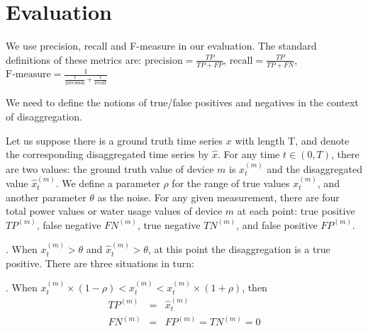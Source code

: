 \section{Evaluation}
%
%
We use precision, recall and F-measure in our evaluation. The standard
definitions of these metrics are:
$\textrm{precision}=\frac{TP}{TP+FP}$, 
$\textrm{recall}=\frac{TP}{TP+FN}$,
$\textrm{F-measure}=\frac{1}{\frac{1}{\textrm{precision}}+\frac{1}{\textrm{recall}}}$

We need to define the notions of true/false positives
and negatives in the context of disaggregation.

Let us suppose there is a ground truth time series $x$ with length T, 
and denote the corresponding disaggregated time series by $\hat{x}$.
For any time $t \in (0, T)$, there are two values: the
ground truth value of device $m$ is $x_t^{(m)}$ and the disaggregated value
$\hat{x}_t^{(m)}$. We define a parameter $\rho$ for the range of
true values $x_t^{(m)}$, and another parameter $\theta$
as the noise.
For any given measurement, 
there are four total power values or water usage values of device $m$ at
each point: true positive $TP^{(m)}$,  false negative $FN^{(m)}$,
true negative $TN^{(m)}$, and false positive $FP^{(m)}$.

. When $x_t^{(m)} > \theta$ and  $\hat{x}_t^{(m)}> \theta  $,
at this point the disaggregation is a true positive.
There are three situations in turn:

. When $  x_t^{(m)} \times (1-\rho) <  \hat{x}_t^{(m)} <  x_t^{(m)} \times (1+\rho)  $, then
\begin{eqnarray*}
 TP^{(m)} &=& \hat{x}_t^{(m)} \\
 FN^{(m)}&=&FP^{(m)} = TN^{(m)}=0
\end{eqnarray*}

